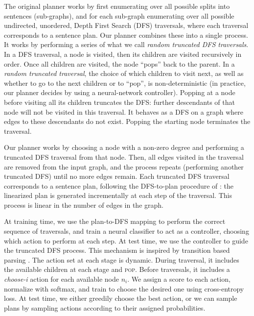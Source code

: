 \documentclass[11pt,a4paper,table,xcdraw]{article}
\begin{document}
The original planner works by first enumerating over all possible splits into sentences (sub-graphs), and for each sub-graph enumerating over all possible undirected, unordered, Depth First Search (DFS) traversals, where each traversal corresponds to a sentence plan. Our planner combines these into a single process.
It works by performing a series of what we call \emph{random truncated DFS traversals}. In a DFS traversal, a node is visited, then its children are visited recursively in order. Once all children are visited, the node ``pops'' back to the parent. In a \emph{random truncated traversal}, the choice of which children to visit next, as well as whether to go to the next children or to ``pop'', is non-deterministic (in practice, our planner decides by using a neural-network controller). Popping at a node before visiting all its children truncates the DFS: further descendants of that node will not be visited in this traversal. It behaves as a DFS on a graph where edges to these descendants do not exist. Popping the starting node terminates the traversal.

Our planner works by choosing a node with a non-zero degree and performing a truncated DFS traversal from that node. Then, all edges visited in the traversal are removed from the input graph, and the process repeats (performing another truncated DFS) until no more edges remain.  Each truncated DFS traversal corresponds to a sentence plan, following the DFS-to-plan procedure of \citet{step-by-step}: the linearized plan is generated incrementally at each step of the traversal. This process is linear in the number of edges in the graph.

At training time, we use the plan-to-DFS mapping to perform the correct sequence of traversals, and train a neural classifier to act as a controller, choosing which action to perform at each step. At test time, we use the controller to guide the truncated DFS process. This mechanism is inspired by transition based parsing \cite{nivre2008integrating}. The action set at each stage is dynamic. During traversal, it includes the available children at each stage and \textsc{pop}. Before traversals, it includes a \emph{choose-i} action for each available node $n_i$. We assign a score to each action, normalize with softmax, and train to choose the desired one using cross-entropy loss. At test time, we either greedily choose the best action, or we can sample plans by sampling actions according to their assigned probabilities.
\end{document}

